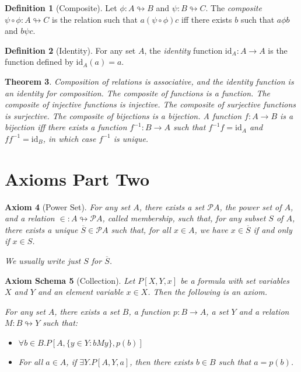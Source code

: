\documentclass{book}
\newtheorem{ax}{Axiom}[chapter]
\newtheorem{axs}[ax]{Axiom Schema}
\newtheorem{thm}[ax]{Theorem}
\theoremstyle{definition}
\newtheorem{df}[ax]{Definition}
\newcommand{\id}[1]{\ensuremath{\mathrm{id}_{#1}}}
\newcommand{\inv}[1]{\ensuremath{{#1}^{-1}}}
\begin{document}
\begin{df}[Composite]
Let $\phi : A \looparrowright B$ and $\psi : B \looparrowright C$. The \emph{composite} $\psi \circ \phi : A \looparrowright C$ is the relation such that $a (\psi \circ \phi) c$ iff there exists $b$ such that $a \phi b$ and $b \psi c$.
\end{df}

\begin{df}[Identity]
For any set $A$, the \emph{identity} function $\id{A} : A \rightarrow A$ is the function defined by $\id{A}(a) = a$.
\end{df}

\begin{thm}
Composition of relations is associative, and the identity function is an identity for composition. The composite of functions is a function. The composite of injective functions is injective. The composite of surjective functions is surjective. The composite of bijections is a bijection. A function $f : A \rightarrow B$ is a bijection iff there exists a function $\inv{f} : B \rightarrow A$ such that $\inv{f} f = \id{A}$ and $f \inv{f} = \id{B}$, in which case $\inv{f}$ is unique.
\end{thm}

\section{Axioms Part Two}

\begin{ax}[Power Set]
For any set $A$, there exists a set $\mathcal{P} A$, the \emph{power set} of $A$, and a relation $\in : A \looparrowright \mathcal{P} A$, called \emph{membership}, such that, for any subset $S$ of $A$, there exists a unique $\overline{S} \in \mathcal{P} A$ such that, for all $x \in A$, we have $x \in \overline{S}$ if and only if $x \in S$.

We usually write just $S$ for $\overline{S}$.
\end{ax}

\begin{axs}[Collection]
Let $P[X,Y,x]$ be a formula with set variables $X$ and $Y$ and an element variable $x \in X$. Then the following is an axiom.

For any set $A$, there exists a set $B$, a function $p : B \rightarrow A$, a set $Y$ and a relation $M : B \looparrowright Y$ such that:
\begin{itemize}
\item $\forall b \in B. P[A, \{ y \in Y : bMy \}, p(b)]$
\item For all $a \in A$, if $\exists Y. P[A,Y,a]$, then there exists $b \in B$ such that $a = p(b)$.
\end{itemize}
\end{axs}
\end{document}
